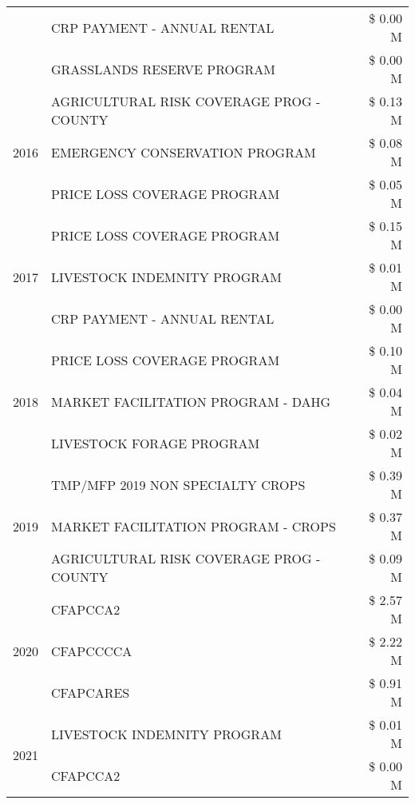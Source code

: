 \begin{tabular}{llr}
 & CRP PAYMENT - ANNUAL RENTAL & \$ 0.00 M \\
 & GRASSLANDS RESERVE PROGRAM & \$ 0.00 M \\
\cline{1-3}
\multirow[t]{3}{*}{2016} & AGRICULTURAL RISK COVERAGE PROG - COUNTY & \$ 0.13 M \\
 & EMERGENCY CONSERVATION PROGRAM & \$ 0.08 M \\
 & PRICE LOSS COVERAGE PROGRAM & \$ 0.05 M \\
\cline{1-3}
\multirow[t]{3}{*}{2017} & PRICE LOSS COVERAGE PROGRAM & \$ 0.15 M \\
 & LIVESTOCK INDEMNITY PROGRAM & \$ 0.01 M \\
 & CRP PAYMENT - ANNUAL RENTAL & \$ 0.00 M \\
\cline{1-3}
\multirow[t]{3}{*}{2018} & PRICE LOSS COVERAGE PROGRAM & \$ 0.10 M \\
 & MARKET FACILITATION PROGRAM - DAHG & \$ 0.04 M \\
 & LIVESTOCK FORAGE PROGRAM & \$ 0.02 M \\
\cline{1-3}
\multirow[t]{3}{*}{2019} & TMP/MFP 2019 NON SPECIALTY CROPS & \$ 0.39 M \\
 & MARKET FACILITATION PROGRAM - CROPS & \$ 0.37 M \\
 & AGRICULTURAL RISK COVERAGE PROG - COUNTY & \$ 0.09 M \\
\cline{1-3}
\multirow[t]{3}{*}{2020} & CFAPCCA2 & \$ 2.57 M \\
 & CFAPCCCCA & \$ 2.22 M \\
 & CFAPCARES & \$ 0.91 M \\
\cline{1-3}
\multirow[t]{2}{*}{2021} & LIVESTOCK INDEMNITY PROGRAM & \$ 0.01 M \\
 & CFAPCCA2 & \$ 0.00 M \\
\cline{1-3}
\bottomrule
\end{tabular}
